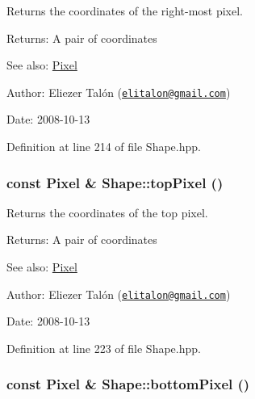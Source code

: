 Returns the coordinates of the right-most pixel. 

\begin{Desc}
\item[Returns:]A pair of coordinates\end{Desc}
\begin{Desc}
\item[See also:]\hyperlink{_pixel_8hpp_535e59456e3e633842529cfa8ea103c4}{Pixel}\end{Desc}
\begin{Desc}
\item[Author:]Eliezer Talón (\href{mailto:elitalon@gmail.com}{\tt elitalon@gmail.com}) \end{Desc}
\begin{Desc}
\item[Date:]2008-10-13 \end{Desc}


Definition at line 214 of file Shape.hpp.\hypertarget{class_shape_070525c7002c5f02361a102d0351520e}{
\subsubsection[topPixel]{\setlength{\rightskip}{0pt plus 5cm}const {\bf Pixel} \& Shape::topPixel ()}}
\label{class_shape_070525c7002c5f02361a102d0351520e}


Returns the coordinates of the top pixel. 

\begin{Desc}
\item[Returns:]A pair of coordinates\end{Desc}
\begin{Desc}
\item[See also:]\hyperlink{_pixel_8hpp_535e59456e3e633842529cfa8ea103c4}{Pixel}\end{Desc}
\begin{Desc}
\item[Author:]Eliezer Talón (\href{mailto:elitalon@gmail.com}{\tt elitalon@gmail.com}) \end{Desc}
\begin{Desc}
\item[Date:]2008-10-13 \end{Desc}


Definition at line 223 of file Shape.hpp.\hypertarget{class_shape_0454e59e7572927e4a29b40c950bc52f}{
\subsubsection[bottomPixel]{\setlength{\rightskip}{0pt plus 5cm}const {\bf Pixel} \& Shape::bottomPixel ()}}
\label{class_shape_0454e59e7572927e4a29b40c950bc52f}


